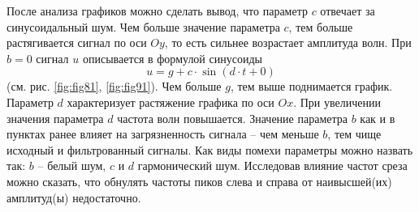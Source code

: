 \documentclass[a4paper, 12pt]{article}
\begin{document}
    
    После анализа графиков можно сделать вывод, что параметр $c$ отвечает за синусоидальный шум. Чем больше значение параметра $c$,
    тем больше растягивается сигнал по оси $Oy$, то есть сильнее возрастает амплитуда волн. При $b=0$ сигнал $u$ описывается
    в формулой синусоиды $$u=g+c\cdot\sin{(d\cdot t+0)}$$ (см. рис. \ref{fig:fig81}, \ref{fig:fig91}). Чем больше $g$, тем выше поднимается график.
    Параметр $d$ характеризует растяжение графика по оси $Ox$. При увеличении значения параметра $d$ частота волн повышается.
    Значение параметра $b$ как и в пунктах ранее влияет на загрязненность сигнала -- чем меньше $b$, тем чище исходный и фильтрованный сигналы.
    Как виды помехи параметры можно назвать так: $b$ -- белый шум, $c \text{ и } d$ гармонический шум.
    Исследовав влияние частот среза можно сказать, что обнулять частоты пиков слева и справа от наивысшей(их) амплитуд(ы) недостаточно.
\end{document}

